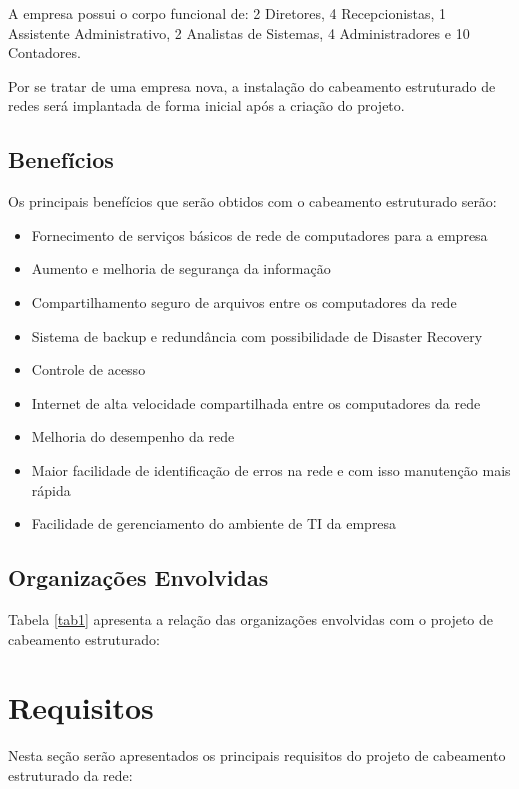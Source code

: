 \documentclass[	DIV=calc,%
							paper=a4,%
							fontsize=12pt,%
							onecolumn]{scrartcl}	 					%
\begin{document}
A empresa possui o corpo funcional de: 2 Diretores, 4 Recepcionistas, 1 Assistente Administrativo, 2 Analistas de Sistemas, 4 Administradores e 10 Contadores.

Por se tratar de uma empresa nova, a instalação do cabeamento estruturado de redes será implantada de forma inicial após a criação do projeto.

\subsection{Benefícios}
Os principais benefícios que serão obtidos com o cabeamento estruturado serão:
\begin{itemize}
\item Fornecimento de serviços básicos de rede de computadores para a empresa
\item Aumento e melhoria de segurança da informação
\item Compartilhamento seguro de arquivos entre os computadores da rede
\item Sistema de backup e redundância com possibilidade de Disaster Recovery
\item Controle de acesso
\item Internet de alta velocidade compartilhada entre os computadores da rede
\item Melhoria do desempenho da rede
\item Maior facilidade de identificação de erros na rede e com isso manutenção mais rápida
\item Facilidade de gerenciamento do ambiente de TI da empresa
\end{itemize}
	
\subsection{Organizações Envolvidas}
Tabela \ref{tab1} apresenta a relação das organizações envolvidas com o projeto de cabeamento estruturado:



\section{Requisitos}

Nesta seção serão apresentados os principais requisitos do projeto de cabeamento estruturado da rede:	
\end{document}
